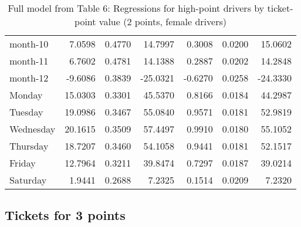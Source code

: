 \documentclass[10pt]{article}
\begin{document}
\begin{table}[ht]
\begin{tabular}{lrrrrrr}
  month-10 & 7.0598 & 0.4770 & 14.7997 & 0.3008 & 0.0200 & 15.0602 \\ 
  month-11 & 6.7602 & 0.4781 & 14.1388 & 0.2887 & 0.0202 & 14.2848 \\ 
  month-12 & -9.6086 & 0.3839 & -25.0321 & -0.6270 & 0.0258 & -24.3330 \\ 
  Monday & 15.0303 & 0.3301 & 45.5370 & 0.8166 & 0.0184 & 44.2987 \\ 
  Tuesday & 19.0986 & 0.3467 & 55.0840 & 0.9571 & 0.0181 & 52.9819 \\ 
  Wednesday & 20.1615 & 0.3509 & 57.4497 & 0.9910 & 0.0180 & 55.1052 \\ 
  Thursday & 18.7207 & 0.3460 & 54.1058 & 0.9441 & 0.0181 & 52.1517 \\ 
  Friday & 12.7964 & 0.3211 & 39.8474 & 0.7297 & 0.0187 & 39.0214 \\ 
  Saturday & 1.9441 & 0.2688 & 7.2325 & 0.1514 & 0.0209 & 7.2320 \\ 
   \hline
\end{tabular}
\caption{Full model from Table 6: Regressions for high-point drivers by ticket-point value (2 points, female drivers)} 
\label{tab_6_2_pts_no_age_F}
\end{table}


\clearpage
\pagebreak




\subsection{Tickets for 3 points}



\end{document}
